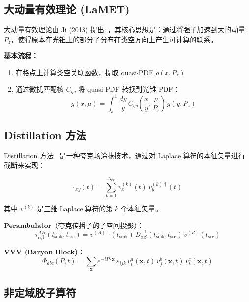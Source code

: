 \documentclass[12pt,a4paper]{ctexart}
\begin{document}
\subsection{大动量有效理论 (LaMET)}

大动量有效理论由 Ji (2013) 提出~\cite{Ji2013}，其核心思想是：通过将强子加速到大的动量 $P_z$，使得原本在光锥上的部分子分布在类空方向上产生可计算的联系。

\textbf{基本流程：}

\begin{enumerate}
    \item 在格点上计算类空关联函数，提取 quasi-PDF $\tilde{g}(x, P_z)$
    \item 通过微扰匹配核 $C_{gg}$ 将 quasi-PDF 转换到光锥 PDF：
    \begin{equation}
        g(x, \mu) = \int_{x}^{1} \frac{dy}{y} \, C_{gg}\left(\frac{x}{y}, \frac{\mu}{P_z}\right) \, \tilde{g}(y, P_z)
    \end{equation}
\end{enumerate}

\subsection{Distillation 方法}

Distillation 方法~\cite{Peardon2009} 是一种夸克场涂抹技术，通过对 Laplace 算符的本征矢量进行截断来实现：

\begin{equation}
\square_{xy}(t) = \sum_{k=1}^{N_{\text{ev}}} v_x^{(k)}(t) \, v_y^{(k)\dagger}(t)
\end{equation}

其中 $v^{(k)}$ 是三维 Laplace 算符的第 $k$ 个本征矢量。

\textbf{Perambulator}（夸克传播子的子空间投影）：
\begin{equation}
\tau_{\alpha\beta}^{AB}(t_{\text{sink}}, t_{\text{src}}) = v^{(A)\dagger}(t_{\text{sink}}) \, D^{-1}_{\alpha\beta}(t_{\text{sink}}, t_{\text{src}}) \, v^{(B)}(t_{\text{src}})
\end{equation}

\textbf{VVV (Baryon Block)}：
\begin{equation}
\Phi_{abc}(P, t) = \sum_{\mathbf{x}} e^{-iP\cdot \mathbf{x}} \, \varepsilon_{ijk} \, v_i^{a}(\mathbf{x}, t) \, v_j^{b}(\mathbf{x}, t) \, v_k^{c}(\mathbf{x}, t)
\end{equation}

\subsection{非定域胶子算符}
\end{document}
